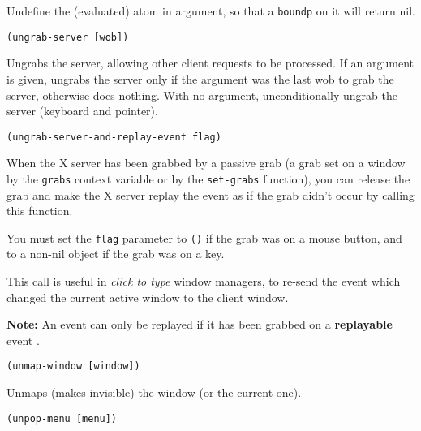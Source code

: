 Undefine the (evaluated) atom in argument, so that a \verb"boundp" on it will
return nil.

        
{\usagefont\begin{verbatim}
(ungrab-server [wob])
\end{verbatim}}\usageupspace

Ungrabs the server, allowing other client requests to be processed.
If an argument is given, ungrabs the server only if the argument was the
last wob to grab the server, otherwise does nothing. With no argument, 
unconditionally ungrab the server (keyboard and pointer).


{\usagefont\begin{verbatim}
(ungrab-server-and-replay-event flag)
\end{verbatim}}\usageupspace

When the X server has been grabbed by a passive grab (a grab set on a
window by the \verb"grabs" context variable or by the \verb"set-grabs"
function), you can release the grab and make the X server replay the event
as if the grab didn't occur by calling this function.

You must set the \verb"flag" parameter to \verb"()" if the grab was on a
mouse button, and to a non-nil object if the grab was on a key.

This call is useful in {\em click to type\/} window managers, to re-send the
event which changed the current active window to the client window.

{\bf Note:} An event can only be replayed if it has been grabbed on a
{\bf replayable} event .

        
{\usagefont\begin{verbatim}
(unmap-window [window])
\end{verbatim}}\usageupspace

Unmaps (makes invisible) the window (or the current one).

        
{\usagefont\begin{verbatim}
(unpop-menu [menu])
\end{verbatim}}\usageupspace

